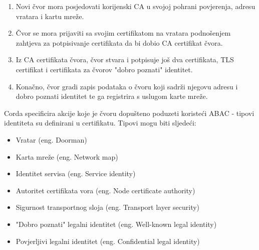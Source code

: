 \documentclass[times, utf8, diplomski]{fer}
\begin{document}
\begin{enumerate}

\item Novi čvor mora posjedovati korijenski CA u svojoj pohrani povjerenja, adresu vratara i kartu mreže.

\item Čvor se mora prijaviti sa svojim certifikatom na vratara podnošenjem zahtjeva za potpisivanje certifikata da bi dobio CA certifikat čvora.

\item Iz CA certifikata čvora, čvor stvara i potpisuje još dva certifikata, TLS certifikat i certifikata za čvorov "dobro poznati" identitet.

\item Konačno, čvor gradi zapis podataka o čvoru koji sadrži njegovu adresu i dobro poznati identitet te ga registrira s uslugom karte mreže.

\end{enumerate}

Corda specificira akcije koje je čvoru dopušteno poduzeti koristeći ABAC - tipovi identiteta su definirani u certifikatu. Tipovi mogu biti sljedeći:

\begin{itemize}

\item Vratar (eng. Doorman)

\item Karta mreže (eng. Network map)

\item Identitet servisa (eng. Service identity)

\item Autoritet certifikata vora (eng. Node certificate authority)

\item Sigurnost transportnog sloja (eng. Transport layer security)

\item "Dobro poznati" legalni identitet (eng. Well-known legal identity)

\item Povjerljivi legalni identitet (eng. Confidential legal identity)

\end{itemize}
\end{document}
